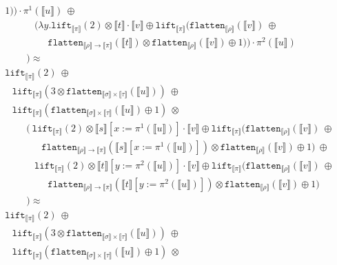 \documentclass[a4paper,UKenglish,cleveref,autoref,numberwithinsect]{lipics-v2019}
\theoremstyle{definition}
\newcommand{\arrtype}{\rightarrow}
\newcommand{\abs}[2]{\lambda #1.#2}
\newcommand{\flatten}{\mathtt{flatten}}
\newcommand{\lift}{\mathtt{lift}}
\newcommand{\typeinterpret}[1]{\llbracket #1 \rrbracket}
\newcommand{\interpret}[1]{\llbracket #1 \rrbracket}
\begin{document}
\begin{itemize}
\[\begin{array}{l}
{    1)}) \cdot \pi^1(\interpret{u})\ \oplus \\
  \phantom{ABCD}
     (\abs{y}{\lift_{\typeinterpret{\pi}}(2) \otimes
     \interpret{t} \cdot \interpret{v} \oplus
    \lift_{\typeinterpret{\pi}}(
    \flatten_{\typeinterpret{\rho}}(\interpret{v})\ \oplus \\
  \phantom{ABCDEF} \flatten_{\typeinterpret{\rho} \arrtype
    \typeinterpret{\pi}}(\interpret{t}) \otimes
    \flatten_{\typeinterpret{\rho}}(\interpret{v}) \oplus 
    1)}) \cdot \pi^2(\interpret{u}) \\
  \phantom{ABC}) \approx \\
  \lift_{\typeinterpret{\pi}}(2)\ \oplus \\
  \phantom{A}
  \lift_{\typeinterpret{\pi}}(3 \otimes \flatten_{\typeinterpret{\sigma}
    \times \typeinterpret{\tau}}(\interpret{u}))\ \oplus \\
  \phantom{A}
  \lift_{\typeinterpret{\pi}}(\flatten_{\typeinterpret{\sigma} \times
    \typeinterpret{\tau}}(\interpret{u}) \oplus 1)\ \otimes \\
  \phantom{ABC}
  (\ \lift_{\typeinterpret{\pi}}(2) \otimes \interpret{s}[x:=\pi^1(
    \interpret{u})] \cdot \interpret{v} \oplus
    \lift_{\typeinterpret{\pi}}(\flatten_{
    \typeinterpret{\rho}}(\interpret{v})\ \oplus \\
  \phantom{ABCDE}\flatten_{\typeinterpret{\rho} \arrtype
    \typeinterpret{\pi}}(\interpret{s}[x:=\pi^1(\interpret{u})]) \otimes
    \flatten_{\typeinterpret{\rho}}(\interpret{v}) \oplus
    1)\ \oplus \\
  \phantom{ABCD}
  \lift_{\typeinterpret{\pi}}(2) \otimes \interpret{t}[y:=\pi^2(
    \interpret{u})] \cdot \interpret{v} \oplus
    \lift_{\typeinterpret{\pi}}(
    \flatten_{\typeinterpret{\rho}}(\interpret{v})\ \oplus \\
  \phantom{ABCDEF} \flatten_{\typeinterpret{\rho} \arrtype
    \typeinterpret{\pi}}(\interpret{t}[y:=\pi^2(\interpret{u})]) \otimes
    \flatten_{\typeinterpret{\rho}}(\interpret{v}) \oplus 
    1) \\
  \phantom{ABC}) \approx \\
  \lift_{\typeinterpret{\pi}}(2)\ \oplus \\
  \phantom{A}
  \lift_{\typeinterpret{\pi}}(3 \otimes \flatten_{\typeinterpret{\sigma}
    \times \typeinterpret{\tau}}(\interpret{u}))\ \oplus \\
  \phantom{A}
  \lift_{\typeinterpret{\pi}}(\flatten_{\typeinterpret{\sigma} \times
    \typeinterpret{\tau}}(\interpret{u}) \oplus 1)\ \otimes \\

\end{array}\]
\end{itemize}
\end{document}
